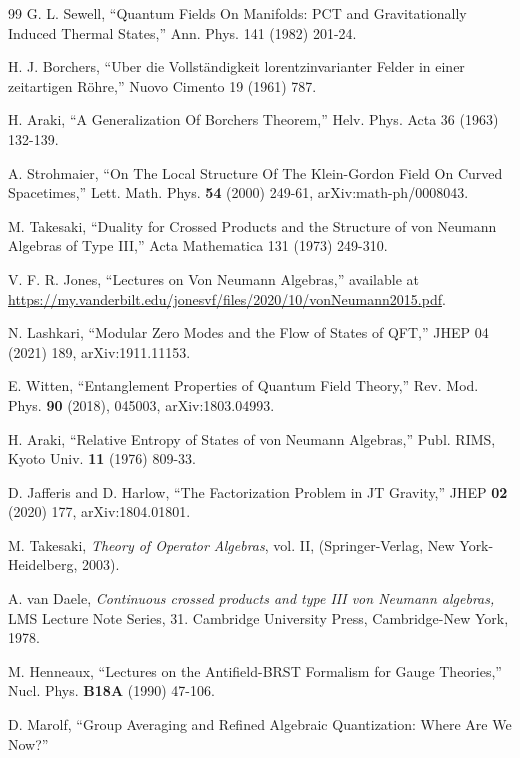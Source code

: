 \documentclass[11pt,a4paper]{article}
\begin{document}
\begin{thebibliography}{99}
G. L. Sewell, ``Quantum Fields On Manifolds: PCT and Gravitationally Induced Thermal
States,'' Ann. Phys. 141 (1982) 201-24.

H. J. Borchers, ``Uber die Vollst\"{a}ndigkeit lorentzinvarianter Felder in einer zeitartigen R\"{o}hre,''
Nuovo Cimento 19 (1961) 787.

 H. Araki, ``A Generalization Of Borchers Theorem,''  Helv. Phys. Acta 36 (1963) 132-139.

A. Strohmaier, ``On The Local Structure Of The Klein-Gordon Field On Curved Spacetimes,'' Lett. Math. Phys. {\bf 54} (2000) 249-61, arXiv:math-ph/0008043.

M. Takesaki, ``Duality for Crossed Products and the Structure of von Neumann Algebras of Type III,'' Acta Mathematica 131 (1973) 249-310.




V. F. R.  Jones, ``Lectures on Von Neumann Algebras,'' available at \url{https://my.vanderbilt.edu/jonesvf/files/2020/10/vonNeumann2015.pdf}.

N. Lashkari, ``Modular Zero Modes and the Flow of States of QFT,'' JHEP 04 (2021) 189,
arXiv:1911.11153.

E. Witten, ``Entanglement Properties of Quantum Field Theory,'' Rev. Mod. Phys. {\bf 90} (2018),  045003, arXiv:1803.04993.

H. Araki, ``Relative Entropy of States of von Neumann Algebras,''  Publ. RIMS, Kyoto Univ. {\bf 11}
(1976) 809-33.

D. Jafferis and D. Harlow, ``The Factorization Problem in JT Gravity,''
JHEP {\bf 02} (2020) 177, arXiv:1804.01801.

 {M. Takesaki}, 
{\it Theory of Operator Algebras}, vol. II, 
(Springer-Verlag, New York-Heidelberg, 2003).

 { A. van Daele},
{\it Continuous crossed products and type III von Neumann algebras,}
LMS Lecture Note Series, 31. Cambridge University Press, Cambridge-New York, 1978.



M. Henneaux, ``Lectures on the Antifield-BRST Formalism for Gauge Theories,'' Nucl. Phys. {\bf B18A} (1990) 47-106.






D. Marolf, ``Group Averaging and Refined Algebraic Quantization: Where Are We Now?'' 

\end{thebibliography}
\end{document}
